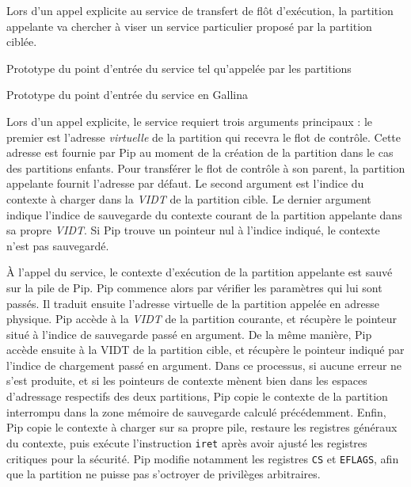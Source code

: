 	Lors d'un appel explicite au service de transfert de flôt d'exécution, la partition appelante va chercher à viser un service particulier proposé par la partition ciblée.

	\begin{listing}
		\caption{Prototype du point d'entrée du service tel qu'appelée par les partitions}
		\label{code:c_proto}
	\end{listing}


	\begin{listing}
		\coqcode{code/prototype.v}
		\caption{Prototype du point d'entrée du service en Gallina}
		\label{code:gallina_proto}
	\end{listing}

Lors d'un appel explicite, le service requiert trois arguments principaux : le premier est l'adresse \emph{virtuelle} de la partition qui recevra le flot de contrôle. Cette adresse est fournie par Pip au moment de la création de la partition dans le cas des partitions enfants. Pour transférer le flot de contrôle à son parent, la partition appelante fournit l'adresse par défaut. Le second argument est l'indice du contexte à charger dans la \emph{VIDT} de la partition cible. Le dernier argument indique l'indice de sauvegarde du contexte courant de la partition appelante dans sa propre \emph{VIDT}. Si Pip trouve un pointeur nul à l'indice indiqué, le contexte n'est pas sauvegardé.

À l'appel du service, le contexte d'exécution de la partition appelante est sauvé sur la pile de Pip. Pip commence alors par vérifier les paramètres qui lui sont passés. Il traduit ensuite l'adresse virtuelle de la partition appelée en adresse physique. Pip accède à la \emph{VIDT} de la partition courante, et récupère le pointeur situé à l'indice de sauvegarde passé en argument. De la même manière, Pip accède ensuite à la VIDT de la partition cible, et récupère le pointeur indiqué par l'indice de chargement passé en argument. Dans ce processus, si aucune erreur ne s'est produite, et si les pointeurs de contexte mènent bien dans les espaces d'adressage respectifs des deux partitions, Pip copie le contexte de la partition interrompu dans la zone mémoire de sauvegarde calculé précédemment. Enfin, Pip copie le contexte à charger sur sa propre pile, restaure les registres généraux du contexte, puis exécute l'instruction \texttt{iret} après avoir ajusté les registres critiques pour la sécurité. Pip modifie notamment les registres \texttt{CS} et \texttt{EFLAGS}, afin que la partition ne puisse pas s'octroyer de privilèges arbitraires.

